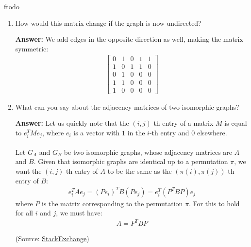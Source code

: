ƒtodo\documentclass{article}
\newenvironment{QandA}{\begin{enumerate}[label=\arabic*.]}{\end{enumerate}}
\newenvironment{InnerQandA}{\begin{enumerate}[label=\roman*.]}{\end{enumerate}}
\newenvironment{answer}{\par\normalfont \textbf{Answer:}}{}
\begin{document}
\begin{QandA}
\begin{InnerQandA}
\begin{answer}
        \end{answer}

        \item How would this matrix change if the graph is now undirected?
        \begin{answer}
            We add edges in the opposite direction as well, making the matrix symmetric:
            \begin{align*}
                \begin{bmatrix}
                    0 & 1 & 0 & 1 & 1 \\
                    1 & 0 & 1 & 1 & 0 \\
                    0 & 1 & 0 & 0 & 0 \\
                    1 & 1 & 0 & 0 & 0 \\
                    1 & 0 & 0 & 0 & 0
                \end{bmatrix}
            \end{align*}
        \end{answer}

        \item What can you say about the adjacency matrices of two isomorphic graphs?
        \begin{answer}
            Let us quickly note that the $(i, j)$-th entry of a matrix $M$ is equal to $e_i^T M e_j$, where $e_i$ is a vector with $1$ in the $i$-th entry and $0$ elsewhere. \\\\
            Let $G_A$ and $G_B$ be two isomorphic graphs, whose adjacency matrices are $A$ and $B$. Given that isomorphic graphs are identical up to a permutation $\pi$, we want the $(i, j)$-th entry of $A$ to be the same as the $(\pi(i), \pi(j))$-th entry of $B$:
            \begin{align*}
                e_i^T A e_j = (Pe_i)^T B (Pe_j) = e_i^T (P^T B P) e_j
            \end{align*}
            where $P$ is the matrix corresponding to the permutation $\pi$. For this to hold for all $i$ and $j$, we must have:
            \begin{align*}
                 A = P^T B P
            \end{align*}
            
            (Source: \href{https://math.stackexchange.com/questions/181273/graph-isomorphism-as-permutation-matrix}{StackExchange})
        \end{answer}
    \end{InnerQandA}


\end{QandA}
\end{document}
